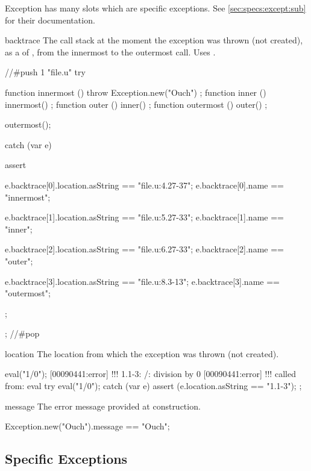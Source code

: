 Exception has many slots which are specific exceptions.  See
\autoref{sec:specs:except:sub} for their documentation.

\begin{urbiscriptapi}
\item[backtrace] The call stack at the moment the exception was thrown (not
  created), as a  of , from the
  innermost to the outermost call.  Uses .
\begin{urbiscript}
//#push 1 "file.u"
try
{
  function innermost () { throw Exception.new("Ouch") };
  function inner     () { innermost() };
  function outer     () { inner() };
  function outermost () { outer() };

  outermost();
}
catch (var e)
{
  assert
  {
    e.backtrace[0].location.asString == "file.u:4.27-37";
    e.backtrace[0].name == "innermost";

    e.backtrace[1].location.asString == "file.u:5.27-33";
    e.backtrace[1].name == "inner";

    e.backtrace[2].location.asString == "file.u:6.27-33";
    e.backtrace[2].name == "outer";

    e.backtrace[3].location.asString == "file.u:8.3-13";
    e.backtrace[3].name == "outermost";
  };
};
//#pop
\end{urbiscript}

\item[location] The location from which the exception was thrown (not
  created).
\begin{urbiscript}
eval("1/0");
[00090441:error] !!! 1.1-3: /: division by 0
[00090441:error] !!!    called from: eval
try
{
  eval("1/0");
}
catch (var e)
{
  assert (e.location.asString == "1.1-3");
};
\end{urbiscript}

\item[message] The error message provided at construction.
\begin{urbiassert}
Exception.new("Ouch").message == "Ouch";
\end{urbiassert}
\end{urbiscriptapi}

\subsection{Specific Exceptions}
\label{sec:specs:except:sub}

